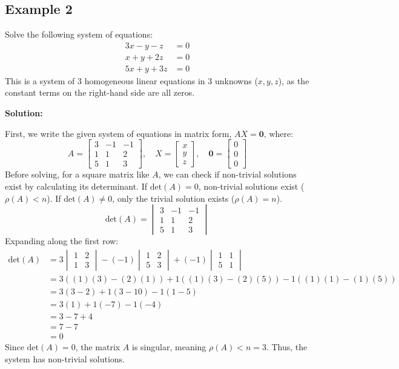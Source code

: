\documentclass{article}
\begin{document}
\subsection{Example 2} %
Solve the following system of equations:
\begin{align*} 3x - y - z &= 0 \\ x + y + 2z &= 0 \\ 5x + y + 3z &= 0 \end{align*}
This is a system of 3 homogeneous linear equations in 3 unknowns ($x, y, z$), as the constant terms on the right-hand side are all zeros.

\textbf{Solution:}

First, we write the given system of equations in matrix form, $AX = \mathbf{0}$, where:
\[ A = \begin{bmatrix} 3 & -1 & -1 \\ 1 & 1 & 2 \\ 5 & 1 & 3 \end{bmatrix}, \quad X = \begin{bmatrix} x \\ y \\ z \end{bmatrix}, \quad \mathbf{0} = \begin{bmatrix} 0 \\ 0 \\ 0 \end{bmatrix} \]
Before solving, for a square matrix like $A$, we can check if non-trivial solutions exist by calculating its determinant. If $\text{det}(A) = 0$, non-trivial solutions exist ($\rho(A) < n$). If $\text{det}(A) \neq 0$, only the trivial solution exists ($\rho(A) = n$).
\[ \text{det}(A) = \begin{vmatrix} 3 & -1 & -1 \\ 1 & 1 & 2 \\ 5 & 1 & 3 \end{vmatrix} \]
Expanding along the first row:
\begin{align*} \text{det}(A) &= 3 \begin{vmatrix} 1 & 2 \\ 1 & 3 \end{vmatrix} - (-1) \begin{vmatrix} 1 & 2 \\ 5 & 3 \end{vmatrix} + (-1) \begin{vmatrix} 1 & 1 \\ 5 & 1 \end{vmatrix} \\ &= 3((1)(3) - (2)(1)) + 1((1)(3) - (2)(5)) - 1((1)(1) - (1)(5)) \\ &= 3(3 - 2) + 1(3 - 10) - 1(1 - 5) \\ &= 3(1) + 1(-7) - 1(-4) \\ &= 3 - 7 + 4 \\ &= 7 - 7 \\ &= 0 \end{align*}
Since $\text{det}(A) = 0$, the matrix $A$ is singular, meaning $\rho(A) < n=3$. Thus, the system has non-trivial solutions.
\end{document}
